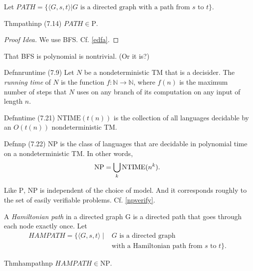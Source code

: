 Let $\textit{PATH}=\{\langle G,s,t\rangle|G\text{ is a directed graph with a path from $s$ to $t$}\}.$

\begin{reference}{Thm}{pathinp}
  (7.14) $\textit{PATH}\in \mathrm{P}$.
\end{reference}

\begin{proof}[Proof Idea]
  We use BFS. Cf. \ref{edfa}.
\end{proof}

That BFS is polynomial is nontrivial. (Or it is?)

\begin{reference}{Defn}{nruntime}
  (7.9) Let $N$ be a nondeterministic TM that is a decisider. The \emph{running time} of $N$ is the function $f:\mathbb{N}\to \mathbb{N}$, where $f(n)$ is the maximum number of steps that $N$ uses on any branch of its computation on any input of length $n$.
\end{reference}

\begin{reference}{Defn}{ntime}
  (7.21) $\mathrm{NTIME}(t(n))$ is the collection of all languages decidable by an $O(t(n))$ nondeterministic TM.
\end{reference}

\begin{reference}{Defn}{np}
  (7.22) $\mathrm{NP}$ is the class of languages that are decidable in polynomial time on a nondeterministic TM. In other words,
  \[
    \mathrm{NP}=\bigcup_k \mathrm{NTIME}(n^k).\qedhere
  \]
\end{reference}

Like $\mathrm{P}$, $\mathrm{NP}$ is independent of the choice of model. And it corresponds roughly to the set of easily verifiable problems. Cf. \ref{npverify}.

A \emph{Hamiltonian path} in a directed graph G is a directed path that goes through each node exactly once. Let
\begin{align*}
  \textit{HAMPATH} = \{ \langle G, s, t \rangle \mid & G \text{ is a directed graph}                            \\
                                                     & \text{with a Hamiltonian path from } s \text{ to } t \}.
\end{align*}

\begin{reference}{Thm}{hampathnp}
  $\textit{HAMPATH}\in \mathrm{NP}$.
\end{reference}

